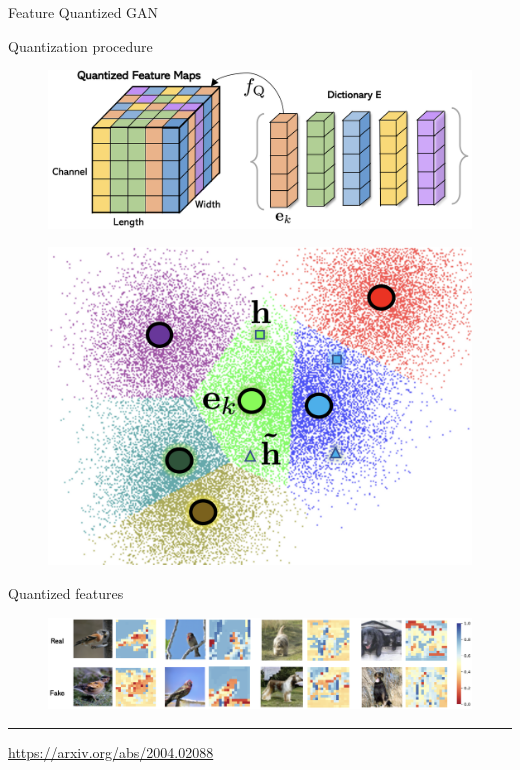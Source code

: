 \documentclass{beamer}
\begin{document}
\begin{frame}{Feature Quantized GAN}
	\begin{block}{Quantization procedure}
		\begin{minipage}[t]{0.65\columnwidth}
			\begin{figure}
				\centering
				\includegraphics[width=\linewidth]{figs/fqgan_cnn.png}
			\end{figure}
		\end{minipage}%
		\begin{minipage}[t]{0.35\columnwidth}
			\begin{figure}
				\centering
				\includegraphics[width=0.9\linewidth]{figs/fqgan_lookup}
			\end{figure}
		\end{minipage}
	\end{block}
	\begin{block}{Quantized features}
		\begin{figure}
			\centering
			\includegraphics[width=\linewidth]{figs/fqgan_features}
		\end{figure}
	\end{block}
	\vfill
	\hrule\medskip
	{\scriptsize \href{https://arxiv.org/abs/2004.02088}{https://arxiv.org/abs/2004.02088}} 
\end{frame}
\end{document}
